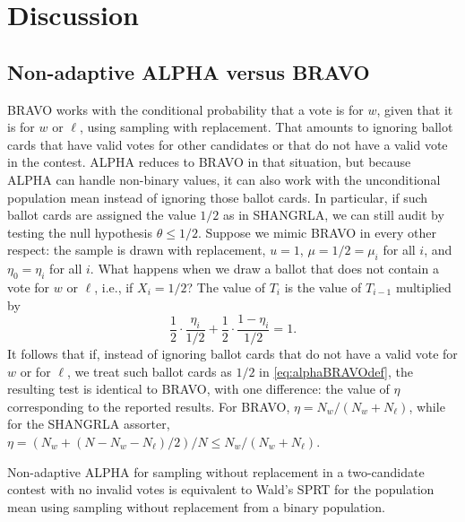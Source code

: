 \documentclass[12pt,runningheads]{llncs}
\begin{document}
{\section{Discussion}

\subsection{Non-adaptive ALPHA versus BRAVO}
BRAVO works with the conditional probability that a vote is for $w$, given that it is for $w$ or $\ell$,
using sampling with replacement.
That amounts to ignoring ballot cards that have valid votes for other candidates or that do not have a valid 
vote in the contest.
 ALPHA reduces to BRAVO in that situation, but because ALPHA can handle non-binary
values, it can also work with the unconditional population mean instead of ignoring those ballot cards.
In particular, if such ballot cards are assigned the value $1/2$ as in SHANGRLA, we can still audit by testing the
null hypothesis $\theta \le 1/2$.
Suppose we mimic BRAVO in every other respect: the sample is drawn with replacement, $u=1$, 
$\mu = 1/2 = \mu_i$ for all $i$, and $\eta_0 = \eta_i$ for all $i$.
What happens when we draw a ballot that does not contain a vote for $w$ or $\ell$, i.e., if $X_i = 1/2$?
The value of $T_i$ is the value of $T_{i-1}$ multiplied by
\begin{equation}
   \frac{1}{2} \cdot \frac{\eta_i}{1/2} + \frac{1}{2} \cdot \frac{1-\eta_i}{1/2} =  1.
\end{equation}
It follows that if, instead of ignoring ballot cards that do not have a valid vote for $w$ or for $\ell$, we treat such ballot cards as
$1/2$ in \ref{eq:alphaBRAVOdef}, the resulting test is identical to BRAVO, with one difference: the value of $\eta$
corresponding to the reported results.
For BRAVO, $\eta = N_w/(N_w+N_\ell)$, while for the SHANGRLA assorter,  $\eta = (N_w + (N-N_w-N_\ell)/2)/N \le N_w/(N_w+N_\ell)$.

Non-adaptive ALPHA for sampling without replacement in a two-candidate contest with no invalid votes is equivalent
to Wald's SPRT for the population mean using sampling without replacement from a binary population.

}
\end{document}
